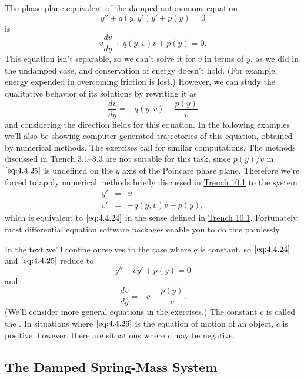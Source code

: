 \documentclass{ximera}
\begin{document}
The phase plane equivalent of the damped autonomous equation
\begin{equation}\label{eq:4.4.24}
y''+q(y,y')y'+p(y)=0
\end{equation}
is
$$
v\frac{dv}{dy}+q(y,v)v+p(y)=0.
$$
This equation isn't  separable, so we can't solve it for $v$ in terms
of
$y$,
as we did in the undamped case, and conservation of energy doesn't
hold. (For example, energy expended in overcoming friction is lost.)
However, we can study the qualitative behavior of its solutions by
rewriting it as
\begin{equation}\label{eq:4.4.25}
\frac{dv}{dy}=-q(y,v)-\frac{p(y)}{v}
\end{equation}
and considering the direction fields for this equation. In the
following examples we'll also be showing computer generated
trajectories of this equation, obtained by numerical methods. The
exercises call for similar computations. 
The methods discussed in
Trench 3.1--3.3 are not suitable for this
task, since  $p(y)/v$ in $\eqref{eq:4.4.25}$ is undefined on the $y$ axis
of the Poincar\'e phase plane. Therefore we're forced to apply
numerical methods briefly discussed in
\href{https://xerxes.ximera.org/differentialequations/main/introToSystems/introToSystems}{Trench 10.1} to the
system
\begin{eqnarray*}
y'&=&v\\
v'&=&-q(y,v)v-p(y),
\end{eqnarray*}
which is equivalent to $\eqref{eq:4.4.24}$ 
in the sense defined in \href{https://xerxes.ximera.org/differentialequations/main/introToSystems/introToSystems}{Trench 10.1}. 
Fortunately, most differential equation software
packages  enable you to do this painlessly.
 
In the text we'll confine ourselves to the case where $q$
is constant, so $\eqref{eq:4.4.24}$ and $\eqref{eq:4.4.25}$  reduce to
\begin{equation}\label{eq:4.4.26}
y''+cy'+p(y)=0
\end{equation}
and
$$
\frac{dv}{dy}=-c-\frac{p(y)}{v}.
$$
(We'll consider more general equations in the exercises.) The constant
$c$ is called the . In situations where
$\eqref{eq:4.4.26}$ is the equation of motion of an object, $c$ is positive;
however, there are situations where  $c$ may be negative.
 
\subsection*{The Damped Spring-Mass System}
 
\end{document}
